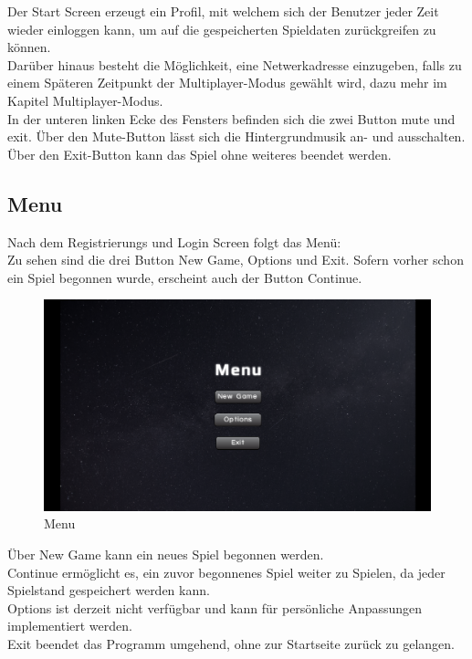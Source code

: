 \documentclass[fontsize=12pt,paper=a4,twoside]{scrartcl}
\begin{document}
Der Start Screen erzeugt ein Profil, mit welchem sich der Benutzer jeder Zeit wieder einloggen kann, um auf die gespeicherten Spieldaten zurückgreifen zu können. \\
Darüber hinaus besteht die Möglichkeit, eine Netwerkadresse einzugeben, falls zu einem Späteren Zeitpunkt der Multiplayer-Modus gewählt wird, dazu mehr im Kapitel Multiplayer-Modus.\\
In der unteren linken Ecke des Fensters befinden sich die zwei Button mute und exit. Über den Mute-Button lässt sich die Hintergrundmusik an- und ausschalten. 
Über den Exit-Button kann das Spiel ohne weiteres beendet werden.

\newpage

\subsection{Menu}

Nach dem Registrierungs und Login Screen folgt das Menü:\\
Zu sehen sind die drei Button New Game, Options und Exit. Sofern vorher schon ein Spiel begonnen wurde, erscheint auch der Button Continue.\\

\begin{figure}[htp]
	\centering
	\includegraphics[width=1.00\linewidth]{pics/menuscreen.png}
	\caption{Menu}
	\label{fig1}

\end{figure}

Über New Game kann ein neues Spiel begonnen werden. \\
Continue ermöglicht es, ein zuvor begonnenes Spiel weiter zu Spielen, da jeder Spielstand gespeichert werden kann.\\
Options ist derzeit nicht verfügbar und kann für persönliche Anpassungen implementiert werden. \\
Exit beendet das Programm umgehend, ohne zur Startseite zurück zu gelangen.\\
\end{document}
